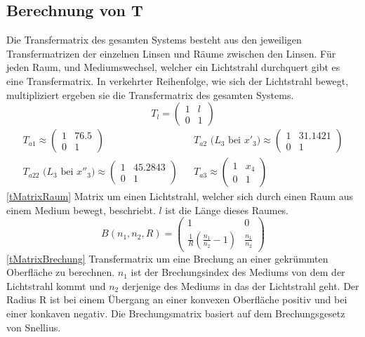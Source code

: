 \documentclass[11pt,twoside,a4paper]{article}
\begin{document}
	\subsection{Berechnung von T}
	Die Transfermatrix des gesamten Systems besteht aus den jeweiligen Transfermatrizen der einzelnen Linsen und Räume zwischen den Linsen. Für jeden Raum, und Mediumswechsel, welcher ein Lichtstrahl durchquert gibt es eine Transfermatrix. In verkehrter Reihenfolge, wie sich der Lichtstrahl bewegt, multipliziert ergeben sie die Transfermatrix des gesamten Systems.
	\begin{equation} \label{tMatrixRaum}
	T_{l} = 
	\begin{pmatrix}
	1 & l \\
	0 & 1
	\end{pmatrix}
	\end{equation}
	\begin{equation*}
	\begin{aligned}
	T_{a1} \approx
	\begin{pmatrix}
	1 & 76.5 \\
	0 & 1
	\end{pmatrix} &
	&
	T_{a2}\textrm{ (\(L_{3}\) bei \(x'_{3}\))} \approx
	\begin{pmatrix}
	1 & 31.1421 \\
	0 & 1
	\end{pmatrix} \\
	T_{a22}\textrm{ (\(L_{3}\) bei \(x''_{3}\))} \approx
	\begin{pmatrix}
	1 &    45.2843 \\
	0 & 1
	\end{pmatrix}&
	&
	T_{a3} \approx
	\begin{pmatrix}
	1 & x_{4} \\
	0 & 1
	\end{pmatrix}
	\end{aligned}
	\end{equation*}
	\ref{tMatrixRaum} Matrix um einen Lichtstrahl, welcher sich durch einen Raum aus einem Medium bewegt, beschriebt. \(l\) ist die Länge dieses Raumes.
	\begin{equation} \label{tMatrixBrechung}
		B(n_{1},n_{2},R) = 
		\begin{pmatrix}
		1 & 0 \\
		\frac{1}{R}(\frac{n_{1}}{n_{2}}-1) & \frac{n_{1}}{n_{2}}
		\end{pmatrix}
	\end{equation}
	\ref{tMatrixBrechung} Transfermatrix um eine Brechung an einer gekrümmten Oberfläche zu berechnen. \(n_{1}\) ist der Brechungsindex des Mediums von dem der Lichtstrahl kommt und \(n_{2}\) derjenige des Mediums in das der Lichtstrahl geht. Der Radius R ist bei einem Übergang an einer konvexen Oberfläche positiv und bei einer konkaven negativ. Die Brechungsmatrix basiert auf dem Brechungsgesetz von Snellius.  \\
\end{document}
